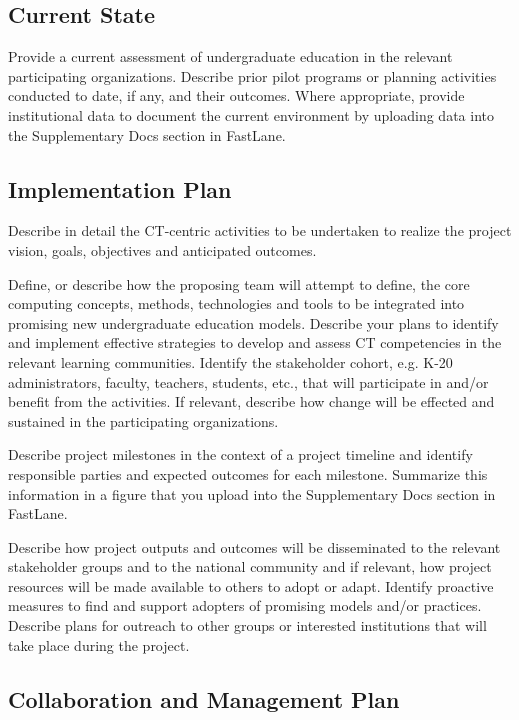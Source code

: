 \subsection*{Current State}

Provide a current assessment of undergraduate education in the relevant participating organizations.  Describe prior pilot programs or planning activities conducted to date, if any, and their outcomes.  Where appropriate, provide institutional data to document the current environment by uploading data into the Supplementary Docs section in FastLane.

\subsection*{Implementation Plan}

Describe in detail the CT-centric activities to be undertaken to realize the project vision, goals, objectives and anticipated outcomes. 

Define, or describe how the proposing team will attempt to define, the core computing concepts, methods, technologies and tools to be integrated into promising new undergraduate education models.  Describe your plans to identify and implement effective strategies to develop and assess CT competencies in the relevant learning communities.  Identify the stakeholder cohort, e.g. K-20 administrators, faculty, teachers, students, etc., that will participate in and/or benefit from the activities. If relevant, describe how change will be effected and sustained in the participating organizations.  

Describe project milestones in the context of a project timeline and identify responsible parties and expected outcomes for each milestone.  Summarize this information in a figure that you upload into the Supplementary Docs section in FastLane. 

Describe how project outputs and outcomes will be disseminated to the relevant stakeholder groups and to the national community and if relevant, how project resources will be made available to others to adopt or adapt. Identify proactive measures to find and support adopters of promising models and/or practices. Describe plans for outreach to other groups or interested institutions that will take place during the project.  


\subsection*{Collaboration and Management Plan}

